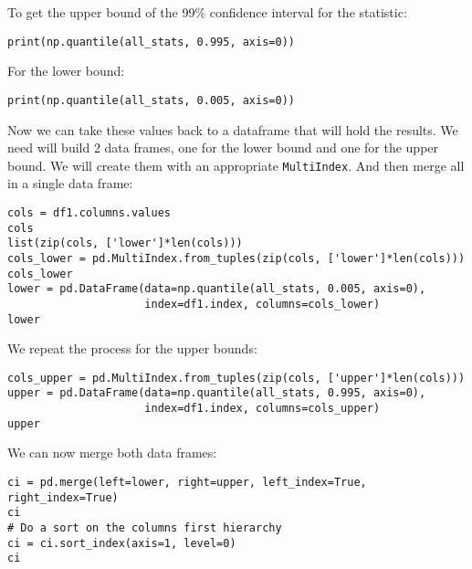 \documentclass[12pt, a4paper]{article}
\begin{document}
To get the upper bound of the 99\% confidence interval for the statistic:
\lstset{language=jupyter-python,label= ,caption= ,captionpos=b,numbers=none}
\begin{lstlisting}
print(np.quantile(all_stats, 0.995, axis=0))
\end{lstlisting}

For the lower bound:
\lstset{language=jupyter-python,label= ,caption= ,captionpos=b,numbers=none}
\begin{lstlisting}
print(np.quantile(all_stats, 0.005, axis=0))
\end{lstlisting}

Now we can take these values back to a dataframe that will hold the results.
We need will build 2 data frames, one for the lower bound and one for the upper bound.
We will create them with an appropriate \texttt{MultiIndex}.
And then merge all in a single data frame:
\lstset{language=jupyter-python,label= ,caption= ,captionpos=b,numbers=none}
\begin{lstlisting}
cols = df1.columns.values
cols
list(zip(cols, ['lower']*len(cols)))
cols_lower = pd.MultiIndex.from_tuples(zip(cols, ['lower']*len(cols)))
cols_lower
lower = pd.DataFrame(data=np.quantile(all_stats, 0.005, axis=0),
                     index=df1.index, columns=cols_lower)
lower
\end{lstlisting}

We repeat the process for the upper bounds:
\lstset{language=jupyter-python,label= ,caption= ,captionpos=b,numbers=none}
\begin{lstlisting}
cols_upper = pd.MultiIndex.from_tuples(zip(cols, ['upper']*len(cols)))
upper = pd.DataFrame(data=np.quantile(all_stats, 0.995, axis=0),
                     index=df1.index, columns=cols_upper)
upper
\end{lstlisting}

We can now merge both data frames:
\lstset{language=jupyter-python,label= ,caption= ,captionpos=b,numbers=none}
\begin{lstlisting}
ci = pd.merge(left=lower, right=upper, left_index=True, right_index=True)
ci
# Do a sort on the columns first hierarchy
ci = ci.sort_index(axis=1, level=0)
ci
\end{lstlisting}
\end{document}
